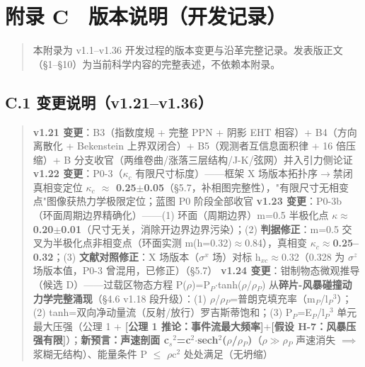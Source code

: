 \documentclass[12pt]{article}
\newcommand{\mtag}[1]{\textbf{[#1]}}
\newcommand{\up}[1]{\ensuremath{^{#1}}}
\newcommand{\down}[1]{\ensuremath{_{#1}}}
\begin{document}
\section*{附录 C　版本说明（开发记录）}

\begin{quote}
本附录为 v1.1--v1.36 开发过程的版本变更与沿革完整记录。发表版正文（\S{}1--\S{}10）为当前科学内容的完整表述，不依赖本附录。
\end{quote}

\subsection*{C.1 变更说明（v1.21--v1.36）}

\begin{quote}
\textbf{v1.21 变更}：B3（指数度规 + 完整 PPN + 阴影 EHT 相容）+ B4（方向离散化 + Bekenstein 上界双闭合）+ B5（观测者互信息面积律 + 16 倍压缩）+ B 分支收官（两维卷曲/涨落三层结构/J-K/弦网）并入引力侧论证
\textbf{v1.22 变更}：P0-3（\ensuremath{\kappa}\down{c} 有限尺寸标度）------框架 X 场版本拓扑序\ensuremath{\to}禁闭真相变定位 \textbf{\ensuremath{\kappa}\down{c} \ensuremath{\approx} 0.25\ensuremath{\pm}0.05}（\S{}5.7，补相图完整性），"有限尺寸无相变点"图像获热力学极限定位；蓝图 P0 阶段全部收官
\textbf{v1.23 变更}：P0-3b（环面周期边界精确化）------(1) 环面（周期边界）m=0.5 半极化点 \textbf{\ensuremath{\kappa}\*\ensuremath{\approx}0.20\ensuremath{\pm}0.01}（尺寸无关，消除开边界边界污染）；(2) \textbf{判据修正}：m=0.5 交叉为半极化点非相变点（环面实测 m(h=0.32)\ensuremath{\approx}0.84），真相变 \textbf{\ensuremath{\kappa}\down{c}\ensuremath{\approx}0.25--0.32}；(3) \textbf{文献对照修正}：X 场版本（\ensuremath{\sigma}\up{x} 场）对标 h\down{xc}\ensuremath{\approx}0.32（0.328 为 \ensuremath{\sigma}\up{z} 场版本值，P0-3 曾混用，已修正）（\S{}5.7）
\textbf{v1.24 变更}：钳制物态微观推导（候选 D）------过载区物态方程 P(\ensuremath{\rho})=P\down{P}\ensuremath{\cdot}tanh(\ensuremath{\rho}/\ensuremath{\rho}\down{P}) 从\textbf{碎片-风暴碰撞动力学完整涌现}（\S{}4.6 v1.18 段升级）：(1) \ensuremath{\rho}/\ensuremath{\rho}\down{P}=普朗克填充率（m\down{P}/l\down{P}\up{3}）；(2) tanh=双向净动量流（反射/放行）罗吉斯蒂饱和；(3) P\down{P}=E\down{P}/l\down{P}\up{3} 单元最大压强（公理 1 + \mtag{公理 1 推论：事件流最大频率}+\mtag{假设 H-7：风暴压强有限}）；\textbf{新预言：声速剖面 c\down{s}\up{2}=c\up{2}\ensuremath{\cdot}sech\up{2}(\ensuremath{\rho}/\ensuremath{\rho}\down{P})}（\ensuremath{\rho}\ensuremath{\gg}\ensuremath{\rho}\down{P} 声速消失 \ensuremath{\implies} 浆糊无结构）、能量条件 P \ensuremath{\leq} \ensuremath{\rho}c\up{2} 处处满足（无坍缩）

\end{quote}
\end{document}
